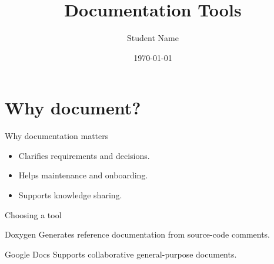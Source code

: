 \documentclass{beamer}
\title{Documentation Tools}
\author{Student Name}
\institute{Technical Writing}
\date{\today}
\begin{document}
\begin{frame}
  \titlepage
\end{frame}
\section{Why document?}
\begin{frame}{Why documentation matters}
  \begin{itemize}
    \item<1-> Clarifies requirements and decisions.
    \item<2-> Helps maintenance and onboarding.
    \item<3-> Supports knowledge sharing.
  \end{itemize}
\end{frame}
\begin{frame}{Choosing a tool}
  \begin{block}{Doxygen}
    Generates reference documentation from source-code comments.
  \end{block}
  \begin{block}{Google Docs}
    Supports collaborative general-purpose documents.
  \end{block}
\end{frame}
\end{document}
